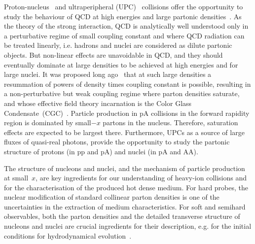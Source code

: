 \documentclass[../report.tex]{subfiles}
\begin{document}
Proton-nucleus~\cite{Salgado:2011wc} and ultraperipheral (UPC)~\cite{Baltz:2007kq} collisions offer the opportunity to study the behaviour of QCD at high energies and large partonic densities~\cite{Kovchegov:2012mbw}. 
As the theory of the strong interaction, QCD is analytically well understood only in a perturbative regime of small coupling constant and where QCD radiation can be treated linearly, i.e. hadrons and nuclei are considered as dilute partonic objects. 
But non-linear effects are unavoidable in QCD, and they should eventually dominate at large densities to be achieved at high energies and for large nuclei. 
It was proposed long ago~\cite{Gribov:1984tu,Mueller:1985wy} that at such large densities a resummation of powers of density times coupling constant is possible, resulting in a non-perturbative but weak coupling regime where parton densities saturate, and whose effective field theory incarnation is the Color Glass Condensate~(CGC)~\cite{Gelis:2010nm}.
Particle production in pA collisions in the forward rapidity region is dominated by small$-x$ partons in the nucleus. 
Therefore, saturation effects are expected to be largest there. Furthermore, UPCs as a source of large fluxes of quasi-real photons, provide the opportunity to study the partonic structure of protons (in pp and pA) and nuclei (in pA and AA).



The structure of nucleons and nuclei, and the mechanism of particle production at small~$x$, are key ingredients for our understanding of heavy-ion collisions and for the characterisation of the produced hot dense medium. 
For hard probes, the nuclear modification of standard collinear parton densities is one of the uncertainties in the extraction of medium characteristics. 
For soft and semihard observables, both the parton densities and the detailed transverse structure of nucleons and nuclei are crucial ingredients for their description, e.g. for the initial conditions for hydrodynamical evolution~\cite{Liu:2015nwa,Weller:2017tsr,Mantysaari:2017cni}.
\end{document}
